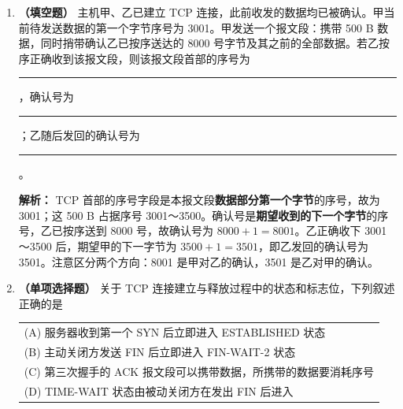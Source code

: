 \begin{enumerate}
伪首部：源 IP 两字 \texttt{0xC0A8}、\texttt{0x0101}；目的 IP 两字 \texttt{0xC0A8}、\texttt{0x0102}；零与协议号合成 \texttt{0x0011}（UDP 协议号为 17）；UDP 长度 \texttt{0x000C}。

UDP 首部（校验和字段置 0）：\texttt{0x1234}、\texttt{0x5678}、\texttt{0x000C}、\texttt{0x0000}。数据：\texttt{0x0102}、\texttt{0x0304}。

逐项累加（每逢进位回卷加 1）：
\[
\begin{aligned}
&\texttt{0xC0A8}+\texttt{0x0101}=\texttt{0xC1A9},\quad
\texttt{0xC1A9}+\texttt{0xC0A8}=\texttt{0x18251}\to\texttt{0x8252},\\
&\texttt{0x8252}+\texttt{0x0102}=\texttt{0x8354},\quad
+\texttt{0x0011}=\texttt{0x8365},\quad
+\texttt{0x000C}=\texttt{0x8371},\\
&+\texttt{0x1234}=\texttt{0x95A5},\quad
+\texttt{0x5678}=\texttt{0xEC1D},\quad
+\texttt{0x000C}=\texttt{0xEC29},\\
&+\texttt{0x0102}=\texttt{0xED2B},\quad
+\texttt{0x0304}=\texttt{0xF02F}.
\end{aligned}
\]
取反得 $\texttt{0xFFFF}-\texttt{0xF02F}=\texttt{0x0FD0}$。验算：$\texttt{0xF02F}+\texttt{0x0FD0}=\texttt{0xFFFF}$，说明接收方再算一遍必得全 1，校验通过。\texttt{0xF02F} 是未取反的和；\texttt{0x9341} 是漏掉伪首部的结果，均不正确。\else \answerarea \fi

\item \textbf{（填空题）} 主机甲、乙已建立 TCP 连接，此前收发的数据均已被确认。甲当前待发送数据的第一个字节序号为 3001。甲发送一个报文段：携带 500 B 数据，同时捎带确认乙已按序送达的 8000 号字节及其之前的全部数据。若乙按序正确收到该报文段，则该报文段首部的序号为 \rule{2cm}{0.4pt}，确认号为 \rule{2cm}{0.4pt}；乙随后发回的确认号为 \rule{2cm}{0.4pt}。

\ifshowsolutions\par\noindent\textbf{解析：} TCP 首部的序号字段是本报文段\textbf{数据部分第一个字节}的序号，故为 3001；这 500 B 占据序号 3001～3500。确认号是\textbf{期望收到的下一个字节}的序号，乙已按序送到 8000 号，故确认号为 $8000+1=8001$。乙正确收下 3001～3500 后，期望甲的下一字节为 $3500+1=3501$，即乙发回的确认号为 3501。注意区分两个方向：8001 是甲对乙的确认，3501 是乙对甲的确认。\else \answerarea \fi

\item \textbf{（单项选择题）} 关于 TCP 连接建立与释放过程中的状态和标志位，下列叙述正确的是
\begin{center}
\begin{tabular}{l}
(A) 服务器收到第一个 SYN 后立即进入 ESTABLISHED 状态 \\[4pt]
(B) 主动关闭方发送 FIN 后立即进入 FIN-WAIT-2 状态 \\[4pt]
(C) 第三次握手的 ACK 报文段可以携带数据，所携带的数据要消耗序号 \\[4pt]
(D) TIME-WAIT 状态由被动关闭方在发出 FIN 后进入
\end{tabular}
\end{center}


\end{enumerate}
